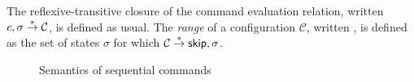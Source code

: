 \documentclass[11pt]{report}
\begin{document}
The reflexive-transitive closure of the command evaluation relation, written $c,\sigma \stackrel{\ast}{\rightarrow} \mathcal{C}$, is defined as usual. The \emph{range} of a configuration $\mathcal{C}$, written , is defined as the set of states $\sigma$ for which $\mathcal{C} \stackrel{\ast}{\rightarrow} \operatorname{\mathsf{skip}},\sigma$. 

\begin{figure}[ht]
    \centering

    \vspace{1em}


    \vspace{1em}


    \vspace{1em}


    \vspace{1em}


    \vspace{1em}


    \vspace{1em}


    \vspace{1em}


    \vspace{1em}


    \vspace{1em}


    \caption{\label{fig:sequential-command-semantics} Semantics of sequential commands}
\end{figure} 
 
\end{document}
